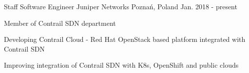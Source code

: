 
\begin{cventries}

  \cventry
    {Staff Software Engineer} %
    {Juniper Networks} %
    {Poznań, Poland} %
    {Jan. 2018 - present} %
    {
      \begin{cvitems} %
        \item {Member of Contrail SDN department}
        \item {Developing Contrail Cloud - Red Hat OpenStack based platform integrated with Contrail SDN }
        \item {Improving integration of Contrail SDN with K8s, OpenShift and public clouds}
      \end{cvitems}
    }



\end{cventries}
